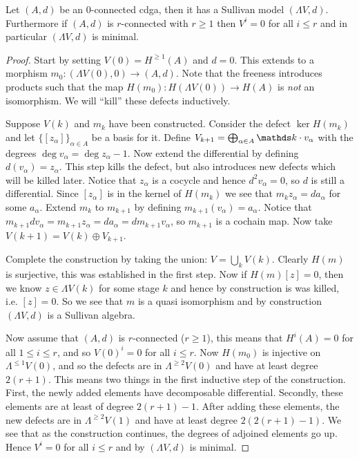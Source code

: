 \begin{theorem}
	Let $(A, d)$ be an $0$-connected cdga, then it has a Sullivan model $(\Lambda V, d)$. Furthermore if $(A, d)$ is $r$-connected with $r \geq 1$ then $V^i = 0$ for all $i \leq r$ and in particular $(\Lambda V, d)$ is minimal.
\end{theorem}
\begin{proof}
	Start by setting $V(0) = H^{\geq 1}(A)$ and $d = 0$. This extends to a morphism $m_0 : (\Lambda V(0), 0) \to (A, d)$.
	Note that the freeness introduces products such that the map $H(m_0) : H(\Lambda V(0)) \to H(A)$ is \emph{not} an isomorphism. We will ``kill'' these defects inductively.

	Suppose $V(k)$ and $m_k$ have been constructed. Consider the defect $\ker H(m_k)$ and let $\{[z_\alpha]\}_{\alpha \in A}$ be a basis for it. Define $V_{k+1} = \bigoplus_{\alpha \in A} \k \cdot v_\alpha$ with the degrees $\deg{v_\alpha} = \deg{z_\alpha}-1$.
	Now extend the differential by defining $d(v_\alpha) = z_\alpha$. This step kills the defect, but also introduces new defects which will be killed later. Notice that $z_\alpha$ is a cocycle and hence $d^2 v_\alpha = 0$, so $d$ is still a differential.
	Since $[z_\alpha]$ is in the kernel of $H(m_k)$ we see that $m_k z_\alpha = d a_\alpha$ for some $a_\alpha$. Extend $m_k$ to $m_{k+1}$ by defining $m_{k+1}(v_\alpha) = a_\alpha$. Notice that $m_{k+1} d v_\alpha = m_{k+1} z_\alpha = d a_\alpha = d m_{k+1} v_\alpha$, so $m_{k+1}$ is a cochain map.
	Now take $V(k+1) = V(k) \oplus V_{k+1}$.

	Complete the construction by taking the union: $V = \bigcup_k V(k)$. Clearly $H(m)$ is surjective, this was established in the first step. Now if $H(m)[z] = 0$, then we know $z \in \Lambda V(k)$ for some stage $k$ and hence by construction is was killed, i.e. $[z] = 0$. So we see that $m$ is a quasi isomorphism and by construction $(\Lambda V, d)$ is a Sullivan algebra.

	 Now assume that $(A, d)$ is $r$-connected ($r \geq 1$), this means that $H^i(A) = 0$ for all $1 \leq i \leq r$, and so $V(0)^i = 0$ for all $i \leq r$. Now $H(m_0)$ is injective on $\Lambda^{\leq 1} V(0)$, and so the defects are in $\Lambda^{\geq 2} V(0)$ and have at least degree $2(r+1)$. This means two things in the first inductive step of the construction. First, the newly added elements have decomposable differential. Secondly, these elements are at least of degree $2(r+1) - 1$. After adding these elements, the new defects are in $\Lambda^{\geq 2} V(1)$ and have at least degree $2(2(r+1) - 1)$. We see that as the construction continues, the degrees of adjoined elements go up. Hence $V^i = 0$ for all $i \leq r$ and by  $(\Lambda V, d)$ is minimal.
\end{proof}


